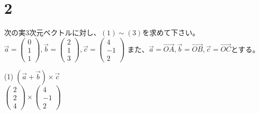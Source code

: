 \documentclass[fleqn]{jsarticle}
\begin{document}
    \section*{2}
    次の実3次元ベクトルに対し、$(1)\sim(3)$を求めて下さい。\\
    $ \vec{a}
    =
    \left(
        \begin{array}{c}
            0 \\
            1 \\
            1
        \end{array}
    \right)
    ,
    \vec{b}
    =
    \left(
        \begin{array}{c}
            2 \\
            1 \\
            3
        \end{array}
    \right)
    ,
    \vec{c}
    =
    \left(
        \begin{array}{c}
            4 \\
            -1 \\
            2
        \end{array}
    \right) $
    また、$\vec{a}=\vec{OA},\vec{b}=\vec{OB},\vec{c}=\vec{OC}$とする。

    \begin{description}
		\setlength{\itemsep}{0.5cm}
        \begin{spacing}{1.2}

            \item[(1)]
                $ (\vec{a}+\vec{b})\times\vec{c} $\\
                $ \left(
                    \begin{array}{c}
                        2 \\
                        2 \\
                        4
                    \end{array}
                \right)
                \times
                \left(
                    \begin{array}{c}
                        4 \\
                        -1 \\
                        2
                    \end{array}
                \right)
                $

        \end{spacing}
    \end{description}
\end{document}

